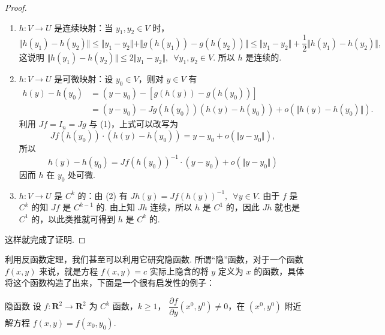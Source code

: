 \begin{proof}
    \begin{enumerate}[label=(\arabic*)]
        \item $h \colon V\to U$ 是连续映射：当 $y_1,y_2\in V$ 时，\[\Vert h(y_1) - h(y_2)\Vert \leqslant \Vert y_1 - y_2 \Vert +\Vert g(h(y_1)) - g(h(y_2))\Vert \leqslant \Vert y_1 - y_2\Vert + \frac{1}{2}\Vert h(y_1) - h(y_2)\Vert,\]
              这说明 $\Vert h(y_1) - h(y_2)\Vert \leqslant 2\Vert y_1 - y_2\Vert,\enspace \forall y_1, y_2\in V$. 所以 $h$ 是连续的.
        \item $h \colon V\to U$ 是可微映射：设 $y_0\in V$，则对 $y\in V$ 有
              \[\begin{aligned}
                      h(y) - h(y_0) & = (y - y_0) - [g(h(y)) - g(h(y_0))]                                    \\
                                    & = (y - y_0) - Jg(h(y_0))(h(y) - h(y_0)) + o(\Vert h(y) - h(y_0)\Vert).
                \end{aligned}\]
              利用 $Jf = I_n = Jg$ 与 (1)，上式可以改写为\[Jf(h(y_0))\cdot(h(y) - h(y_0)) = y - y_0 + o(\Vert y - y_0\Vert),\]
              所以 \[h(y) - h(y_0) = Jf(h(y_0))^{-1}\cdot(y - y_0) + o(\Vert y - y_0\Vert)\]
              因而 $h$ 在 $y_0$ 处可微.
        \item $h \colon V\to U$ 是 $C^k$ 的：由 (2) 有 $Jh(y) = Jf(h(y))^{-1},\enspace \forall y\in V$. 由于 $f$ 是 $C^k$ 的知 $Jf$ 是 $C^{k-1}$ 的. 由上知 $Jh$ 连续，所以 $h$ 是 $C^1$ 的，因此 $Jh$ 就也是 $C^1$ 的，以此类推就可得到 $h$ 是 $C^k$ 的.
    \end{enumerate}

    这样就完成了证明.
\end{proof}

利用反函数定理，我们甚至可以利用它研究隐函数. 所谓``隐''函数，对于一个函数 $f(x, y)$ 来说，就是方程 $f(x, y) = c$ 实际上隐含的将 $y$ 定义为 $x$ 的函数，具体将这个函数构造了出来，下面是一个很有启发性的例子：

\begin{example}{}{隐函数}
    设 $f\colon\mathbf{R}^2\to\mathbf{R}^2$ 为 $C^{k}$ 函数，$k\geqslant 1$， $\dfrac{\partial f}{\partial y}(x^0, y^0)\neq 0$，在 $(x^0, y^0)$ 附近解方程 $f(x, y) = f(x_0, y_0)$.
\end{example}

